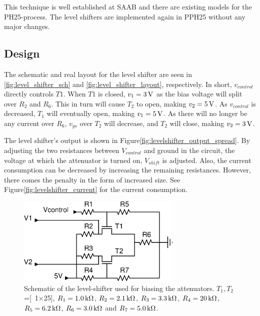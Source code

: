 		This technique is well established at SAAB and there are existing models for the PH25-process\autocite{gustavsson07}. The level shifters are implemented again in PPH25 without any major changes.
		
	\subsection{Design}
		The schematic  and real layout for the level shifter are seen in \autoref{fig:level_shifter_sch} and \autoref{fig:level_shifter_layout}, respectively.
		In short, $v_{control}$  directly controls $T1$. When $T1$ is closed, $v_1=\unit[3]{V}$ as the bias voltage will split over $R_2$ and $R_6$. This in turn will cause $T_2$ to open, making  $v_2=\unit[5]{V}$. As $v_{control}$ is decreased, $T_1$ will eventually open, making $v_1=\unit[5]{V}$. As there will no longer be any current over $R_6$, $v_{gs}$ over $T_2$ will decrease, and $T_2$ will close, making $v_2=\unit[3]{V}$.
		
		The level shifter's output is shown in Figure\autoref{fig:levelshifter_output_spread}. By adjusting the two resistances between $V_{control}$ and ground in the circuit, the voltage at which the attenuator is turned on, $V_{shift}$ is adjusted. Also, the current consumption can be decreased by increasing the remaining resistances. However, there comes the penalty in the form of increased size. See Figure\autoref{fig:levelshifter_current} for the current consumption.


		\begin{figure}[h!]
			\centering
			\includegraphics[width=0.7\textwidth]{fig/attenuators/sch_level_shifter}
			\caption[Level-shifter schematic layout]{Schematic of the level-shifter used for biasing the attenuators. $T_1,T_2$=\unit[1$\times$25]{\mum}, $R_1=\unit[1.0]{k\Omega}$, $R_2=\unit[2.1]{k\Omega}$, $R_3=\unit[3.3]{k\Omega}$, $R_4=\unit[20]{k\Omega}$, $R_5=\unit[6.2]{k\Omega}$, $R_6=\unit[3.0]{k\Omega}$ and $R_7=\unit[5.0]{k\Omega}$.}\label{fig:level_shifter_sch}
		\end{figure}
		
